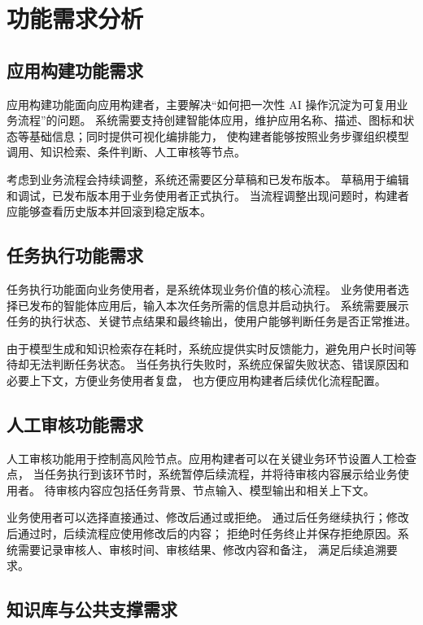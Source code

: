 \section{功能需求分析}

\subsection{应用构建功能需求}

应用构建功能面向应用构建者，主要解决“如何把一次性 AI 操作沉淀为可复用业务流程”的问题。
系统需要支持创建智能体应用，维护应用名称、描述、图标和状态等基础信息；同时提供可视化编排能力，
使构建者能够按照业务步骤组织模型调用、知识检索、条件判断、人工审核等节点。

考虑到业务流程会持续调整，系统还需要区分草稿和已发布版本。
草稿用于编辑和调试，已发布版本用于业务使用者正式执行。
当流程调整出现问题时，构建者应能够查看历史版本并回滚到稳定版本。

\subsection{任务执行功能需求}

任务执行功能面向业务使用者，是系统体现业务价值的核心流程。
业务使用者选择已发布的智能体应用后，输入本次任务所需的信息并启动执行。
系统需要展示任务的执行状态、关键节点结果和最终输出，使用户能够判断任务是否正常推进。

由于模型生成和知识检索存在耗时，系统应提供实时反馈能力，避免用户长时间等待却无法判断任务状态。
当任务执行失败时，系统应保留失败状态、错误原因和必要上下文，方便业务使用者复盘，
也方便应用构建者后续优化流程配置。

\subsection{人工审核功能需求}

人工审核功能用于控制高风险节点。应用构建者可以在关键业务环节设置人工检查点，
当任务执行到该环节时，系统暂停后续流程，并将待审核内容展示给业务使用者。
待审核内容应包括任务背景、节点输入、模型输出和相关上下文。

业务使用者可以选择直接通过、修改后通过或拒绝。
通过后任务继续执行；修改后通过时，后续流程应使用修改后的内容；
拒绝时任务终止并保存拒绝原因。系统需要记录审核人、审核时间、审核结果、修改内容和备注，
满足后续追溯要求。

\subsection{知识库与公共支撑需求}

